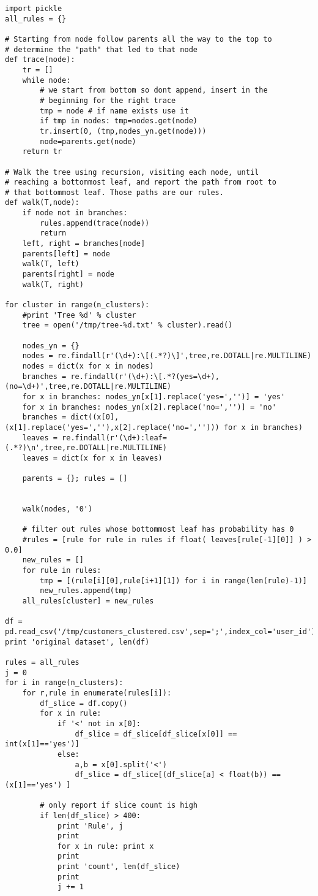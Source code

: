 \documentclass[12pt,fleqn]{article}\usepackage{../common}
\begin{document}
\begin{verbatim}
import pickle
all_rules = {}

# Starting from node follow parents all the way to the top to
# determine the "path" that led to that node
def trace(node):
    tr = []
    while node:
        # we start from bottom so dont append, insert in the
        # beginning for the right trace
        tmp = node # if name exists use it
        if tmp in nodes: tmp=nodes.get(node)
        tr.insert(0, (tmp,nodes_yn.get(node)))
        node=parents.get(node)
    return tr

# Walk the tree using recursion, visiting each node, until
# reaching a bottommost leaf, and report the path from root to
# that bottommost leaf. Those paths are our rules.
def walk(T,node):
    if node not in branches:
        rules.append(trace(node))
        return
    left, right = branches[node]
    parents[left] = node
    walk(T, left)
    parents[right] = node
    walk(T, right)

for cluster in range(n_clusters):
    #print 'Tree %d' % cluster
    tree = open('/tmp/tree-%d.txt' % cluster).read()

    nodes_yn = {}
    nodes = re.findall(r'(\d+):\[(.*?)\]',tree,re.DOTALL|re.MULTILINE)
    nodes = dict(x for x in nodes)
    branches = re.findall(r'(\d+):\[.*?(yes=\d+),(no=\d+)',tree,re.DOTALL|re.MULTILINE)
    for x in branches: nodes_yn[x[1].replace('yes=','')] = 'yes'
    for x in branches: nodes_yn[x[2].replace('no=','')] = 'no'
    branches = dict((x[0],(x[1].replace('yes=',''),x[2].replace('no=',''))) for x in branches)
    leaves = re.findall(r'(\d+):leaf=(.*?)\n',tree,re.DOTALL|re.MULTILINE)        
    leaves = dict(x for x in leaves)

    parents = {}; rules = []


    walk(nodes, '0')

    # filter out rules whose bottommost leaf has probability has 0
    #rules = [rule for rule in rules if float( leaves[rule[-1][0]] ) > 0.0]
    new_rules = []
    for rule in rules:
        tmp = [(rule[i][0],rule[i+1][1]) for i in range(len(rule)-1)]
        new_rules.append(tmp)
    all_rules[cluster] = new_rules
    
df = pd.read_csv('/tmp/customers_clustered.csv',sep=';',index_col='user_id')
print 'original dataset', len(df)

rules = all_rules
j = 0
for i in range(n_clusters):
    for r,rule in enumerate(rules[i]): 
        df_slice = df.copy()
        for x in rule: 
            if '<' not in x[0]: 
                df_slice = df_slice[df_slice[x[0]] == int(x[1]=='yes')]
            else:
                a,b = x[0].split('<')
                df_slice = df_slice[(df_slice[a] < float(b)) == (x[1]=='yes') ]

        # only report if slice count is high
        if len(df_slice) > 400:
            print 'Rule', j
            print
            for x in rule: print x
            print
            print 'count', len(df_slice)
            print
            j += 1
\end{verbatim}
\end{document}
